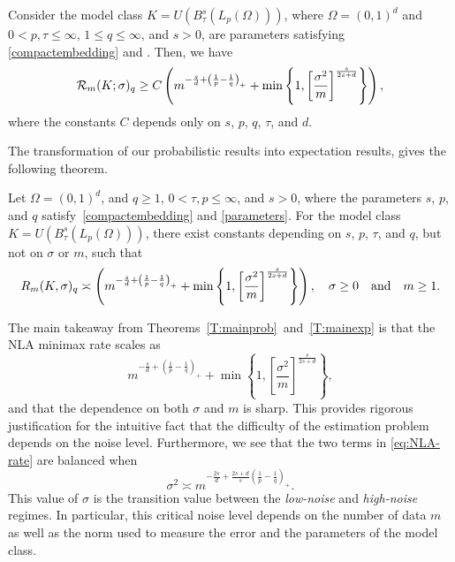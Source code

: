  


\begin{theorem}  \label{T:mainexplb} 
    Consider the model class $K = U(B^s_\tau(L_p(\Omega)))$, where $\Omega = (0,1)^d$ and $0 < p,\tau \leq \infty$,   $1\leq q\leq \infty$, and $s > 0$, are parameters satisfying \eqref{compactembedding} and . 
    Then, we have
    \begin{equation} \label{mmbound1}
{\cal R}_m(K;\sigma)_q\geq C\left(m^{-\frac{s}{d} + \left(\frac{1}{p} -\frac{1}{q}\right)_+}+ \min\left\{1, \left[\frac{\sigma^2}{m}\right]^{\frac{s}{2s + d}}\right\} \right),
    \end{equation}
    where the  constants $C$ depends only on $s$, $p$, $q$, $\tau$, and $d$. 
\end{theorem}

The transformation of our probabilistic results into expectation results, gives the following theorem.

\begin{theorem}  \label{T:mainexp} 
    Let $\Omega = (0,1)^d$, and  $q\ge 1$, $0< \tau,p \leq \infty$,  and $s>0$, where the parameters $s$, $p$, and $q$ satisfy~\eqref{compactembedding} and \eqref{parameters}.  For the model class $K = U(B^s_\tau(L_p(\Omega)))$,  there exist constants  depending on
    $s$, $p$, $\tau$, and $q$, but not on $\sigma$ or $m$, such that
    \begin{equation} \label{mmbound2}
   R_m(K,\sigma)_q \asymp 
   \left(m^{-\frac{s}{d} + \left(\frac{1}{p} -\frac{1}{q}\right)_+}+ \min\left\{1,\left[\frac{\sigma^2}{m}\right]^{\frac{s}{2s + d}}\right\}\right),\quad  \sigma\geq 0 \quad {\rm and} \quad   m\ge 1. 
   \end{equation}
\end{theorem}


The main takeaway from Theorems~\ref{T:mainprob}~and~\ref{T:mainexp} is that the NLA minimax rate scales as
\begin{equation}
   m^{-\frac{s}{d} + \left(\frac{1}{p} -\frac{1}{q}\right)_+}+ \min\left\{1,\left[\frac{\sigma^2}{m}\right]^{\frac{s}{2s + d}}\right\},  \label{eq:NLA-rate}
\end{equation}
and that the dependence on both $\sigma$ and $m$ is sharp. This  provides rigorous justification for the intuitive fact that the difficulty  of the estimation problem depends on the noise level. Furthermore, we see that the two terms in \eqref{eq:NLA-rate} are balanced when
\begin{equation}
    \sigma^2 \asymp m^{-\frac{2s}{d} + \frac{2s + d}{s}\left(\frac{1}{p} -\frac{1}{q}\right)_+}.
    \label{eq:critical-noise-level}
\end{equation}
This value of $\sigma$ is the transition value between the \emph{low-noise} and 
\emph{high-noise} regimes. In particular, this critical noise level depends on the number of data $m$ as well as the norm used to measure the error and the parameters of the model class. 




